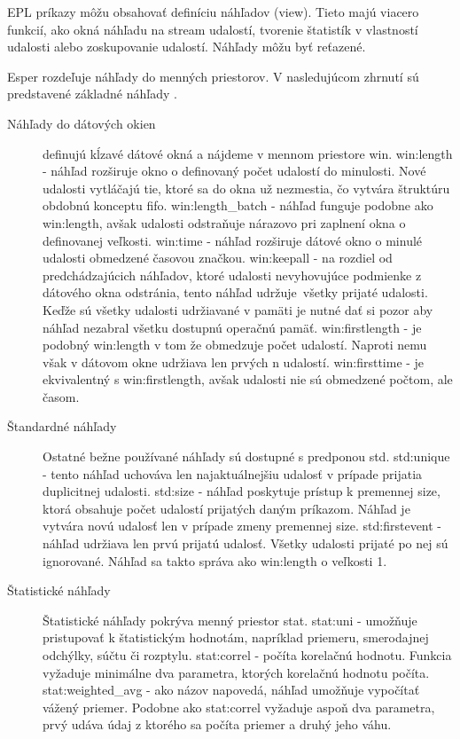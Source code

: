 		EPL príkazy môžu obsahovať definíciu náhľadov (view). Tieto majú viacero funkcií, ako okná náhľadu na stream udalostí, tvorenie štatistík v vlastností udalosti alebo zoskupovanie udalostí. Náhľady môžu byť reťazené.

		Esper rozdeľuje náhľady do menných priestorov. V nasledujúcom zhrnutí sú predstavené základné náhľady \cite{web:esper-doc}.
		
		\begin{description}
			\item[Náhľady do dátových okien] definujú kĺzavé dátové okná a nájdeme v mennom priestore win.
				\subitem win:length - náhľad rozširuje okno o definovaný počet udalostí do minulosti. Nové udalosti vytláčajú tie, ktoré sa do okna už nezmestia, čo vytvára štruktúru obdobnú konceptu fifo.
				\subitem win:length\_batch - náhľad funguje podobne ako win:length, avšak udalosti odstraňuje nárazovo pri zaplnení okna o definovanej veľkosti.
				\subitem win:time - náhľad rozširuje dátové okno o minulé udalosti obmedzené časovou značkou.
				\subitem win:keepall - na rozdiel od predchádzajúcich náhľadov, ktoré udalosti nevyhovujúce podmienke z dátového okna odstránia, tento náhľad udržuje\ všetky prijaté udalosti. Keďže sú všetky udalosti udržiavané v pamäti je nutné dať si pozor aby náhľad nezabral všetku dostupnú operačnú pamäť.
				\subitem win:firstlength - je podobný win:length v tom že obmedzuje počet udalostí. Naproti nemu však v dátovom okne udržiava len prvých n udalostí.
				\subitem win:firsttime - je ekvivalentný s win:firstlength, avšak udalosti nie sú obmedzené počtom, ale časom.

			\item[Štandardné náhľady] Ostatné bežne používané náhľady sú dostupné s predponou std.
				\subitem std:unique - tento náhľad uchováva len najaktuálnejšiu udalosť v prípade prijatia duplicitnej udalosti.
				\subitem std:size - náhľad poskytuje prístup k premennej size, ktorá obsahuje počet udalostí prijatých daným príkazom. Náhľad je vytvára novú udalosť len v prípade zmeny premennej size. 
				\subitem std:firstevent - náhľad udržiava len prvú prijatú udalosť. Všetky udalosti prijaté po nej sú ignorované. Náhľad sa takto správa ako win:length o veľkosti 1.

			\item[Štatistické náhľady] Štatistické náhľady pokrýva menný priestor stat.
				\subitem stat:uni - umožňuje pristupovať k štatistickým hodnotám, napríklad priemeru, smerodajnej odchýlky, súčtu či rozptylu.
				\subitem stat:correl - počíta korelačnú hodnotu. Funkcia vyžaduje minimálne dva parametra, ktorých korelačnú hodnotu počíta.
				\subitem stat:weighted\_avg - ako názov napovedá, náhľad umožňuje vypočítať vážený priemer. Podobne ako stat:correl vyžaduje aspoň dva parametra, prvý udáva údaj z ktorého sa počíta priemer a druhý jeho váhu.
		\end{description}
		
